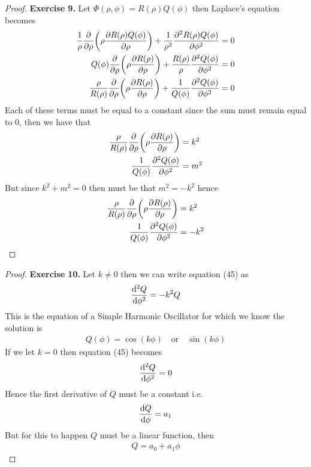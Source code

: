 \documentclass[11pt]{article}
\theoremstyle{definition}
\begin{document}
\cleardoublepage
\begin{proof}{\textbf{Exercise 9.}}
Let $\Phi(\rho, \phi) = R(\rho)Q(\phi)$ then Laplace's equation becomes
\begin{align*}
    \frac{1}{\rho}\pdv{\rho}(\rho\pdv{R(\rho)Q(\phi)}{\rho})
    + \frac{1}{\rho^2}\pdv[2]{R(\rho)Q(\phi)}{\phi} &= 0\\
    Q(\phi)\pdv{\rho}(\rho\pdv{R(\rho)}{\rho})
    + \frac{R(\rho)}{\rho}\pdv[2]{Q(\phi)}{\phi} &= 0\\
    \frac{\rho}{R(\rho)}\pdv{\rho}(\rho\pdv{R(\rho)}{\rho})
    + \frac{1}{Q(\phi)}\pdv[2]{Q(\phi)}{\phi} &= 0
\end{align*}
Each of these terms must be equal to a constant since the sum must remain equal
to 0, then we have that
\begin{align*}
    \frac{\rho}{R(\rho)}\pdv{\rho}(\rho\pdv{R(\rho)}{\rho}) &= k^2\\
    \frac{1}{Q(\phi)}\pdv[2]{Q(\phi)}{\phi} &= m^2
\end{align*}
But since $k^2 + m^2 = 0$ then must be that $m^2 = -k^2$ hence
\begin{align*}
    \frac{\rho}{R(\rho)}\pdv{\rho}(\rho\pdv{R(\rho)}{\rho}) &= k^2\\
    \frac{1}{Q(\phi)}\pdv[2]{Q(\phi)}{\phi} &= -k^2
\end{align*}
\end{proof}
\begin{proof}{\textbf{Exercise 10.}}
Let $k \neq 0$ then we can write equation (45) as
\begin{align*}
    \dv[2]{Q}{\phi} = -k^2Q
\end{align*}
This is the equation of a Simple Harmonic Oscillator for which we know 
the solution is
\begin{align*}
    Q(\phi) = \cos(k\phi) \quad\text{or}\quad \sin(k\phi)
\end{align*}
If we let $k = 0$ then equation (45) becomes
\begin{align*}
    \dv[2]{Q}{\phi} = 0
\end{align*}
Hence the first derivative of $Q$ must be a constant i.e. 
\begin{align*}
    \dv{Q}{\phi} = a_1
\end{align*}
But for this to happen $Q$ must be a linear function, then
\begin{align*}
    Q = a_0 + a_1\phi
\end{align*}
\end{proof}
\end{document}
